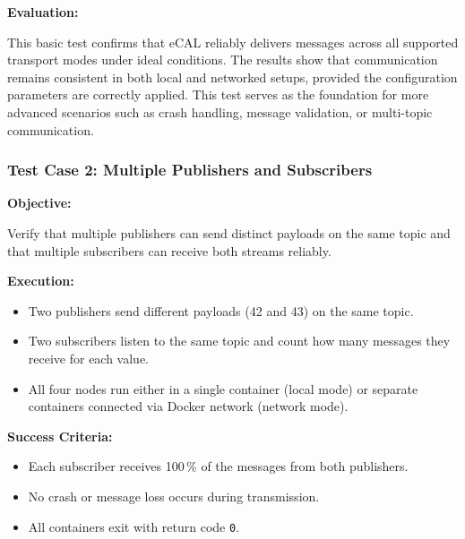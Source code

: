 \vspace{1em}

\textbf{Evaluation:}

\vspace{0.4em}
This basic test confirms that eCAL reliably delivers messages across all supported transport modes under ideal conditions. The results show that communication remains consistent in both local and networked setups, provided the configuration parameters are correctly applied. This test serves as the foundation for more advanced scenarios such as crash handling, message validation, or multi-topic communication.


\vspace{1em}
\vspace{1em}
\subsubsection{Test Case 2: Multiple Publishers and Subscribers}
\label{sec:tc2}

\textbf{Objective:}

\vspace{0.4em}
Verify that multiple publishers can send distinct payloads on the same topic and that multiple subscribers can receive both streams reliably.

\vspace{0.5em}
\textbf{Execution:}
\begin{itemize}
	\item Two publishers send different payloads (42 and 43) on the same topic.
	\item Two subscribers listen to the same topic and count how many messages they receive for each value.
	\item All four nodes run either in a single container (local mode) or separate containers connected via Docker network (network mode).
\end{itemize}

\textbf{Success Criteria:}
\begin{itemize}
	\item Each subscriber receives 100\,\% of the messages from both publishers.
	\item No crash or message loss occurs during transmission.
	\item All containers exit with return code \texttt{0}.
\end{itemize}

